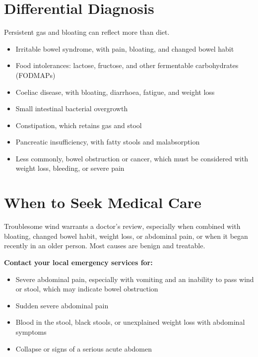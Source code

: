 \section*{Differential Diagnosis}
Persistent gas and bloating can reflect more than diet.
\begin{itemize}
    \item Irritable bowel syndrome, with pain, bloating, and changed bowel habit
    \item Food intolerances: lactose, fructose, and other fermentable carbohydrates (FODMAPs)
    \item Coeliac disease, with bloating, diarrhoea, fatigue, and weight loss
    \item Small intestinal bacterial overgrowth
    \item Constipation, which retains gas and stool
    \item Pancreatic insufficiency, with fatty stools and malabsorption
    \item Less commonly, bowel obstruction or cancer, which must be considered with weight loss, bleeding, or severe pain
\end{itemize}

\section*{When to Seek Medical Care}
Troublesome wind warrants a doctor's review, especially when combined with bloating, changed bowel habit, weight loss, or abdominal pain, or when it began recently in an older person. Most causes are benign and treatable.

\textbf{Contact your local emergency services for:}
\begin{itemize}
    \item Severe abdominal pain, especially with vomiting and an inability to pass wind or stool, which may indicate bowel obstruction
    \item Sudden severe abdominal pain
    \item Blood in the stool, black stools, or unexplained weight loss with abdominal symptoms
    \item Collapse or signs of a serious acute abdomen
\end{itemize}

